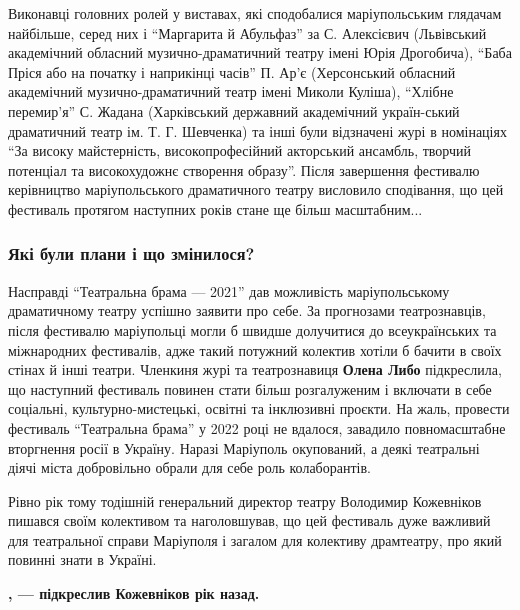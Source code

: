 Виконавці головних ролей у виставах, які сподобалися маріупольським глядачам
найбільше, серед них і \enquote{Маргарита й Абульфаз} за С. Алексієвич (Львівський
академічний обласний музично-драматичний театру імені Юрія Дрогобича), \enquote{Баба
Пріся або на початку і наприкінці часів} П. Ар'є (Херсонський обласний
академічний музично-драматичний театр імені Миколи Куліша), \enquote{Хлібне перемир'я}
С. Жадана (Харківський державний академічний україн\hyp{}ський драматичний театр ім.
Т. Г. Шевченка) та інші були відзначені журі в номінаціях \enquote{За високу
майстерність, високопрофесійний акторський ансамбль, творчий потенціал та
високохудожнє створення образу}. Після завершення фестивалю керівництво
маріупольського драматичного театру висловило сподівання, що цей фестиваль
протягом наступних років стане ще більш масштабним...


\subsubsection{Які були плани і що змінилося?}

Насправді \enquote{Театральна брама — 2021} дав можливість маріупольському драматичному
театру успішно заявити про себе. За прогнозами театрознавців, після фестивалю
маріупольці могли б швидше долучитися до всеукраїнських та міжнародних
фестивалів, адже такий потужний колектив хотіли б бачити в своїх стінах й інші
театри. Членкиня журі та театрознавиця \textbf{Олена Либо} підкреслила, що наступний
фестиваль повинен стати більш розгалуженим і включати в себе соціальні,
культурно-мистецькі, освітні та інклюзивні проєкти. На жаль, провести фестиваль
\enquote{Театральна брама} у 2022 році не вдалося, завадило повномасштабне вторгнення
росії в Україну. Наразі Маріуполь окупований, а деякі театральні діячі міста
добровільно обрали для себе роль колаборантів.

Рівно рік тому тодішній генеральний директор театру Володимир Кожевніков
пишався своїм колективом та наголовшував, що цей фестиваль дуже важливий для
театральної справи Маріуполя і загалом для колективу драмтеатру, про який
повинні знати в Україні. 

\begin{leftbar}
	\begingroup
		\bfseries
{}, — підкреслив Кожевніков рік назад. 
	\endgroup
\end{leftbar}

